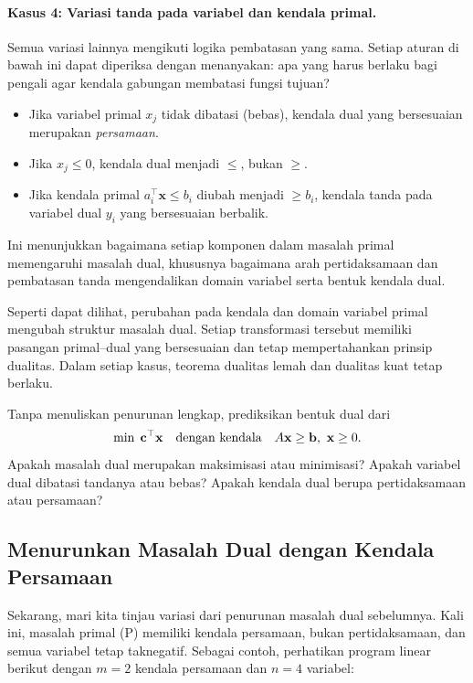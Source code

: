 \paragraph{Kasus 4: Variasi tanda pada variabel dan kendala primal.}
Semua variasi lainnya mengikuti logika pembatasan yang sama. Setiap aturan di bawah ini dapat diperiksa dengan menanyakan: apa yang harus berlaku bagi pengali agar kendala gabungan membatasi fungsi tujuan?

\begin{itemize}
  \item Jika variabel primal \( x_j \) tidak dibatasi (bebas), kendala dual yang bersesuaian merupakan \emph{persamaan}.
  \item Jika \( x_j \leq 0 \), kendala dual menjadi \( \leq \), bukan \( \geq \).
  \item Jika kendala primal \( a_i^\top \mathbf{x} \leq b_i \) diubah menjadi \( \geq b_i \), kendala tanda pada variabel dual \( y_i \) yang bersesuaian berbalik.
\end{itemize}

Ini menunjukkan bagaimana setiap komponen dalam masalah primal memengaruhi masalah dual, khususnya bagaimana arah pertidaksamaan dan pembatasan tanda mengendalikan domain variabel serta bentuk kendala dual.

Seperti dapat dilihat, perubahan pada kendala dan domain variabel primal mengubah struktur masalah dual. Setiap transformasi tersebut memiliki pasangan primal--dual yang bersesuaian dan tetap mempertahankan prinsip dualitas. Dalam setiap kasus, teorema dualitas lemah dan dualitas kuat tetap berlaku.

\begin{learningcheckpoint}[label={lc:dual-forms}]
Tanpa menuliskan penurunan lengkap, prediksikan bentuk dual dari
\[
\min\; \mathbf{c}^\top \mathbf{x} \quad \mbox{dengan kendala}\quad A\mathbf{x} \geq \mathbf{b},\ \mathbf{x} \geq 0.
\]
Apakah masalah dual merupakan maksimisasi atau minimisasi? Apakah variabel dual dibatasi tandanya atau bebas? Apakah kendala dual berupa pertidaksamaan atau persamaan?
\end{learningcheckpoint}

\subsection*{Menurunkan Masalah Dual dengan Kendala Persamaan}

Sekarang, mari kita tinjau variasi dari penurunan masalah dual sebelumnya. Kali ini, masalah primal (P) memiliki kendala persamaan, bukan pertidaksamaan, dan semua variabel tetap taknegatif. Sebagai contoh, perhatikan program linear berikut dengan $m=2$ kendala persamaan dan $n=4$ variabel:

